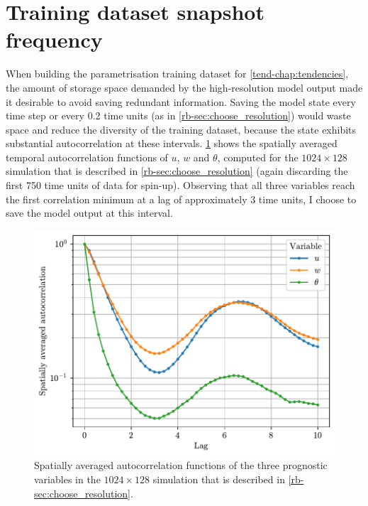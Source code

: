 \documentclass[../main.tex]{subfiles}
\begin{document}


\section{Training dataset snapshot frequency} \label{sec:snapshot_freq}
When building the parametrisation training dataset for
\cref{tend-chap:tendencies}, the amount of storage space demanded by the
high-resolution model output made it desirable to avoid saving redundant
information. Saving the model state every time step or every 0.2 time units
(as in \cref{rb-sec:choose_resolution}) would waste space and reduce the
diversity of the training dataset, because the state exhibits substantial
autocorrelation at these intervals. \cref{fig:autocorr} shows the
spatially averaged temporal autocorrelation functions of $u$, $w$ and $\theta$,
computed for the $1024 \times 128$ simulation that is described in
\cref{rb-sec:choose_resolution} (again discarding the first 750 time units of
data for spin-up). Observing that all three variables reach the first
correlation minimum at a lag of approximately 3 time units, I choose to
save the model output at this interval.

\begin{figure}[ht]
    \centering
    \includegraphics[width=0.6\linewidth]{figures/autocorrelation.pdf}
    \caption{
        Spatially averaged autocorrelation functions of the three prognostic
        variables in the $1024 \times 128$ simulation that is described in
        \cref{rb-sec:choose_resolution}.
    }
    \label{fig:autocorr}
\end{figure}


\ifSubfilesClassLoaded{%
    \emergencystretch=5em
    \printbibliography{}
}{}
\end{document}
